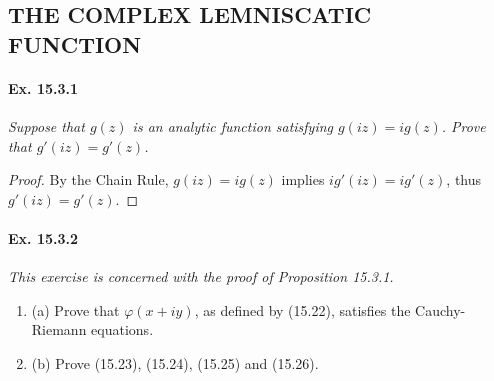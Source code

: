 \documentclass[11pt,a4paper]{article}
\newcommand{\be} {\begin{enumerate}}
\newcommand{\ee} {\end{enumerate}}
\begin{document}
\subsection{THE COMPLEX LEMNISCATIC FUNCTION}

\paragraph{Ex. 15.3.1}{\it Suppose that $g(z)$ is an analytic function satisfying $g(iz) = i g(z)$. Prove that $g'(iz) = g'(z)$.
}

\begin{proof} 
By the Chain Rule, $g(iz) = i g(z)$ implies $ig'(iz) = ig'(z)$, thus $g'(iz) = g'(z)$.
\end{proof}

\paragraph{Ex. 15.3.2}{\it This exercise is concerned with the proof of Proposition 15.3.1.
\be
\item[(a)] Prove that $\varphi(x+iy)$, as defined by (15.22), satisfies the Cauchy-Riemann equations.
\item[(b)] Prove (15.23), (15.24), (15.25) and (15.26).
\ee
}
\end{document}
